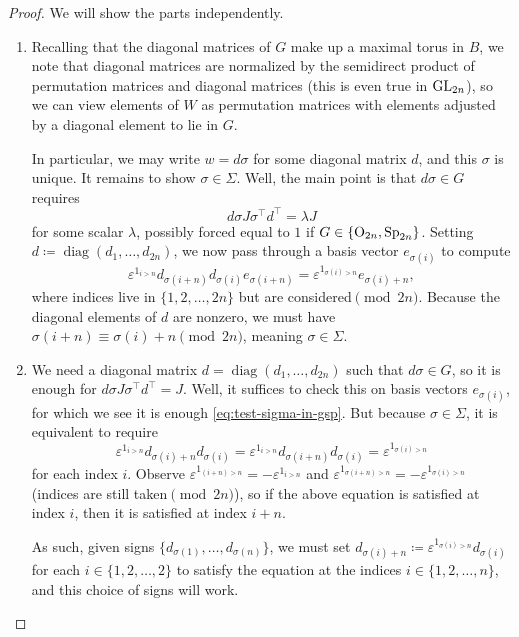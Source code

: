 \begin{proof}
    We will show the parts independently.
    \begin{enumerate}[label=(\alph*)]
        \item Recalling that the diagonal matrices of $G$ make up a maximal torus in $B$, we note that diagonal matrices are normalized by the semidirect product of permutation matrices and diagonal matrices (this is even true in $\mathrm{GL}_{2n}$), so we can view elements of $W$ as permutation matrices with elements adjusted by a diagonal element to lie in $G$.
        
        In particular, we may write $w=d\sigma$ for some diagonal matrix $d$, and this $\sigma$ is unique. It remains to show $\sigma\in\Sigma$. Well, the main point is that $d\sigma\in G$ requires
        \[d\sigma J\sigma^\intercal d^\intercal=\lambda J\]
        for some scalar $\lambda$, possibly forced equal to $1$ if $G\in\{\mathrm{O}_{2n},\mathrm{Sp}_{2n}\}$. Setting $d\coloneqq\operatorname{diag}(d_1,\ldots,d_{2n})$, we now pass through a basis vector $e_{\sigma(i)}$ to compute
        \begin{equation}
            \varepsilon^{1_{i>n}}d_{\sigma(i+n)}d_{\sigma(i)}e_{\sigma(i+n)}=\varepsilon^{1_{\sigma(i)>n}}e_{\sigma(i)+n}, \label{eq:test-sigma-in-gsp}
        \end{equation}
        where indices live in $\{1,2,\ldots,2n\}$ but are considered$\pmod{2n}$. Because the diagonal elements of $d$ are nonzero, we must have $\sigma(i+n)\equiv\sigma(i)+n\pmod{2n}$, meaning $\sigma\in\Sigma$.

        \item We need a diagonal matrix $d=\operatorname{diag}(d_1,\ldots,d_{2n})$ such that $d\sigma\in G$, so it is enough for $d\sigma J\sigma^\intercal d^\intercal=J$. Well, it suffices to check this on basis vectors $e_{\sigma(i)}$, for which we see it is enough \eqref{eq:test-sigma-in-gsp}. But because $\sigma\in\Sigma$, it is equivalent to require
        \[\varepsilon^{1_{i>n}}d_{\sigma(i)+n}d_{\sigma(i)}=\varepsilon^{1_{i>n}}d_{\sigma(i+n)}d_{\sigma(i)}=\varepsilon^{1_{\sigma(i)>n}}\]
        for each index $i$. Observe $\varepsilon^{1_{(i+n)>n}}=-\varepsilon^{1_{i>n}}$ and $\varepsilon^{1_{\sigma(i+n)>n}}=-\varepsilon^{1_{\sigma(i)>n}}$ (indices are still taken$\pmod{2n}$), so if the above equation is satisfied at index $i$, then it is satisfied at index $i+n$.
        
        As such, given signs $\{d_{\sigma(1)},\ldots,d_{\sigma(n)}\}$, we must set $d_{\sigma(i)+n}\coloneqq\varepsilon^{1_{\sigma(i)>n}}d_{\sigma(i)}$ for each $i\in\{1,2,\ldots,2\}$ to satisfy the equation at the indices $i\in\{1,2,\ldots,n\}$, and this choice of signs will work.
        \qedhere
    \end{enumerate}
\end{proof}
